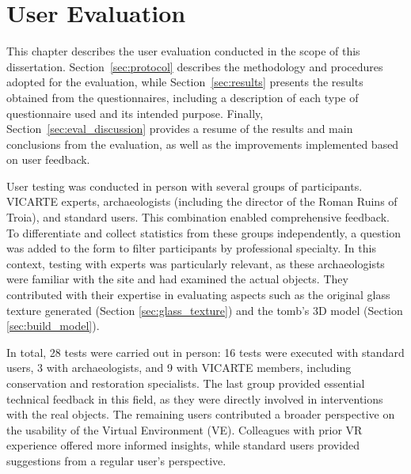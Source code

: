 
%

\chapter{User Evaluation}
\label{cha:user_evaluation}
\setlength{\parskip}{0pt} 

This chapter describes the user evaluation conducted in the scope of this dissertation. 
Section~\ref{sec:protocol} describes the methodology and procedures adopted for the evaluation, while Section~\ref{sec:results} presents the results obtained from the questionnaires, including a description of each type of questionnaire used and its intended purpose.
Finally, Section~\ref{sec:eval_discussion} provides a resume of the results and main conclusions from the evaluation, as well as the improvements implemented based on user feedback.

User testing was conducted in person with several groups of participants. \gls{VICARTE} experts, archaeologists (including the director of the Roman Ruins of Troia), and standard users. This combination enabled comprehensive feedback.
To differentiate and collect statistics from these groups independently, a question was added to the form to filter participants by professional specialty.
In this context, testing with experts was particularly relevant, as these archaeologists were familiar with the site and had examined the actual objects. They contributed with their expertise in evaluating aspects such as the original glass texture generated (Section \ref{sec:glass_texture}) and the tomb’s \gls{3D} model (Section \ref{sec:build_model}).

In total, 28 tests were carried out in person: 16 tests were executed with standard users, 3 with archaeologists, and 9 with \gls{VICARTE} members, including conservation and restoration specialists. The last group provided essential technical feedback in this field, as they were directly involved in interventions with the real objects.
The remaining users contributed a broader perspective on the usability of the Virtual Environment (\gls{VE}). Colleagues with prior \gls{VR} experience offered more informed insights, while standard users provided suggestions from a regular user’s perspective.

